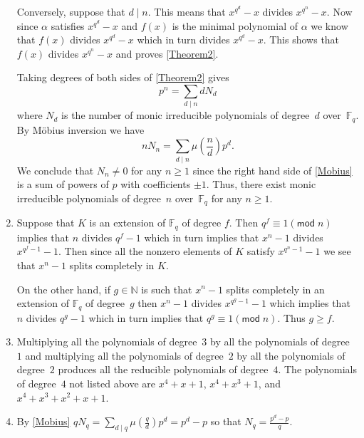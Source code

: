 \documentclass[12pt]{article}
\renewcommand{\pmod}[1]{\left(\mathsf{mod}\;#1\right)}
\begin{document}
\begin{enumerate}
Conversely, suppose that $d\mid n$. This means that $x^{q^d}-x$
divides $x^{q^n}-x$. Now since $\alpha$ satisfies $x^{q^d}-x$
and $f\left(x\right)$ is the minimal polynomial of $\alpha$
we know that $f\left(x\right)$ divides $x^{q^d}-x$ which in
turn divides $x^{q^d}-x$. This shows that $f\left(x\right)$
divides $x^{q^n}-x$ and proves \autoref{Theorem2}.

Taking degrees of both sides of \autoref{Theorem2} gives
\[p^n=\sum_{d\mid n}dN_d\]
where $N_d$ is the number of monic irreducible polynomials
of degree~$d$ over~$\mathbb{F}_q$.
By M\"obius inversion we have
\begin{equation}\label{Mobius}
nN_n=\sum_{d\mid n}\mu\left(\frac{n}{d}\right)p^d.
\end{equation}
We conclude that $N_n\ne 0$ for any $n\ge 1$ since
the right hand side of \autoref{Mobius} is a sum
of powers of $p$ with coefficients $\pm 1$.
Thus, there exist monic irreducible polynomials of degree~$n$
over~$\mathbb{F}_q$ for any $n\ge 1$.

\item %
Suppose that $K$ is an extension of $\mathbb{F}_q$ of degree $f$. Then
$q^f\equiv 1\pmod{n}$ implies that $n$ divides $q^f-1$
which in turn implies that $x^n-1$ divides $x^{q^f-1}-1$.
Then since all the nonzero elements of $K$ satisfy $x^{q^n-1}-1$
we see that $x^n-1$ splits completely in $K$.

On the other hand, if $g\in\mathbb{N}$ is such that
$x^n-1$ splits completely in an extension of $\mathbb{F}_q$
of degree~$g$ then $x^n-1$ divides $x^{q^g-1}-1$
which implies that $n$ divides $q^g-1$ which in turn implies
that $q^g\equiv 1\pmod{n}$. Thus $g\ge f$.

\item %
Multiplying all the polynomials of degree~$3$ by all the polynomials
of degree~$1$ and multiplying all the polynomials of degree~$2$
by all the polynomials of degree~$2$
produces all the reducible polynomials of degree~$4$.
The polynomials of degree~$4$ not listed above are
$x^4+x+1$, $x^4+x^3+1$, and $x^4+x^3+x^2+x+1$.

\item %
By \autoref{Mobius}
$qN_q=\sum_{d\mid q}\mu\left(\frac{q}{d}\right)p^d
=p^d-p$ so that $N_q=\frac{p^d-p}{q}$.


\end{enumerate}
\end{document}
